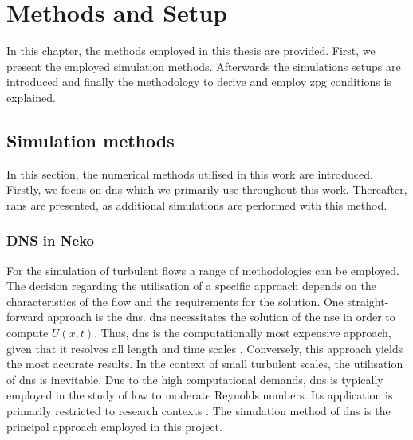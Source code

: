 
\chapter{Methods and Setup} \label{chap:methods}

In this chapter, the methods employed in this thesis are provided. 
First, we present the employed simulation methods.
Afterwards the simulations setups are introduced and finally the methodology to derive and employ \acrshort{zpg} conditions is explained. 

\section{Simulation methods}\label{sec:SimMethods}

In this section, the numerical methods utilised in this work are introduced.
Firstly, we focus on \acrshort{dns} which we primarily use throughout this work.
Thereafter, \acrshort{rans} are presented, as additional simulations are performed with this method.

\subsection{DNS in Neko}\label{subsec:DNSmethod}

For the simulation of turbulent flows a range of methodologies can be employed.
The decision regarding the utilisation of a specific approach depends on the characteristics of the flow and the requirements for the solution.
One straight-forward approach is the \acrshort{dns}.
\acrshort{dns} necessitates the solution of the \acrshort{nse} in order to compute $U(x,t)$.
Thus, \acrshort{dns} is the computationally most expensive approach, given that it resolves all length and time scales \citep{pope_turbulent_2015}. 
Conversely, this approach yields the most accurate results.
In the context of small turbulent scales, the utilisation of \acrshort{dns} is inevitable.
Due to the high computational demands, \acrshort{dns} is typically employed in the study of low to moderate Reynolds numbers. 
Its application is primarily restricted to research contexts \citep{slotnick_cfd_2014}.
The simulation method of \acrshort{dns} is the principal approach employed in this project.


